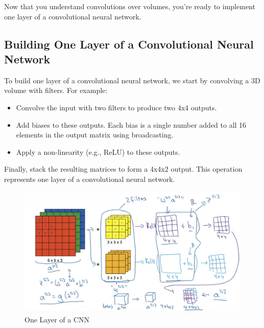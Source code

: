 \documentclass[letterpaper,12pt,notitlepage,twoside]{report}
\begin{document}
Now that you understand convolutions over volumes, you're ready to implement one layer of a convolutional neural network.

\subsection{Building One Layer of a Convolutional Neural Network}
To build one layer of a convolutional neural network, we start by convolving a 3D volume with filters. For example:
\begin{itemize}[nosep]
    \item Convolve the input with two filters to produce two 4x4 outputs.
    \item Add biases to these outputs. Each bias is a single number added to all 16 elements in the output matrix using broadcasting.
    \item Apply a non-linearity (e.g., ReLU) to these outputs.
\end{itemize}

Finally, stack the resulting matrices to form a 4x4x2 output. This operation represents one layer of a convolutional neural network.

\begin{figure}[h]
	\centering
	\includegraphics[width=\textwidth]{Images/One Layer of a CNN.png}
	\caption{One Layer of a CNN}
	\label{fig:27}
\end{figure}
\FloatBarrier
\end{document}
